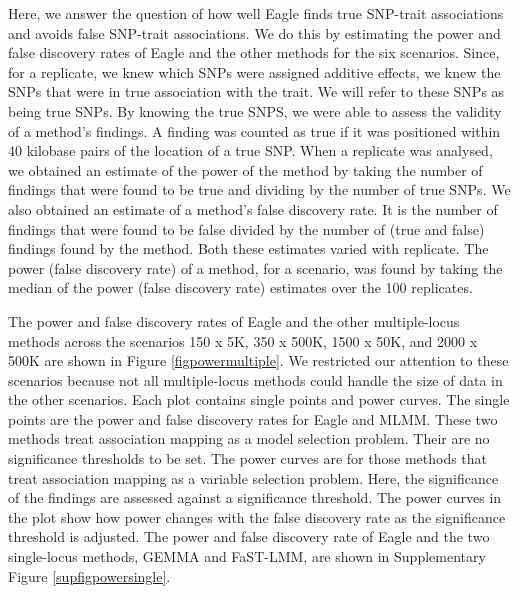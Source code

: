 \documentclass{article}
\begin{document}
Here, we answer the question of how well Eagle finds true SNP-trait associations and avoids false SNP-trait associations. We do this by estimating the power and false discovery rates of Eagle and the other methods for the six scenarios.  Since, for a replicate, we knew which SNPs were assigned additive effects, we knew the SNPs that were in true association with the trait. We will refer to these SNPs as being
true SNPs. By knowing the true SNPS, we were able to assess the validity of a method's findings. A  finding was counted as true if it was positioned within 40 kilobase pairs of the location of a true SNP. When a replicate was analysed, we obtained an estimate of the power of the method by taking  the number of findings that were found to be  true and dividing by the 
number of true SNPs. We also obtained an estimate of a method's false discovery rate. It is the number of findings that were found to be false divided by the number of (true and false) findings found by the method.  Both these estimates varied with replicate. 
The power (false discovery rate) of a method, for a scenario, was found by taking the median of the power (false discovery rate) estimates over the 100 replicates. 


The power and false discovery rates of Eagle and the other multiple-locus methods across the scenarios 150 x 5K, 350 x 500K, 1500 x 50K, and 2000 x 500K are shown in Figure \ref{figpowermultiple}.  We restricted our attention to these scenarios because not all 
multiple-locus methods could handle the size of data in the other scenarios. 
  Each plot contains 
single points and power curves. The single points are the power and false discovery rates for Eagle and MLMM.
These two methods treat association mapping as a model selection problem. Their are no significance thresholds to be set. 
The power curves are for those methods that treat association mapping as a variable selection problem. Here, the 
significance of the findings are assessed against a significance threshold. The power curves in the plot show how power changes with 
the false discovery rate as the significance threshold  is adjusted. 
The power and false discovery rate of Eagle and the two single-locus methods, GEMMA and FaST-LMM,  are shown in
Supplementary Figure \ref{supfigpowersingle}. 
\end{document}

